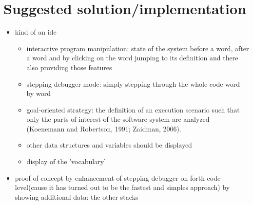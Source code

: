 \chapter{Suggested solution/implementation}

\begin{itemize}
\item kind of an ide
\begin{itemize}
\item interactive program manipulation: state of the system before a word, after a word and by clicking on the word jumping to its definition and there also providing those features
\item stepping debugger mode: simply stepping through the whole code word by word
\item goal-oriented strategy: the definition of an execution scenario such that only the parts of interest of the software system are analyzed (Koenemann and Robertson, 1991; Zaidman,
2006).
\item other data structures and variables should be displayed
\item display of the 'vocabulary'
\end{itemize}
\item proof of concept by enhancement of stepping debugger on forth code level(cause it has turned out to be the fastest and simples approach) by showing additional data: the other stacks
\end{itemize}